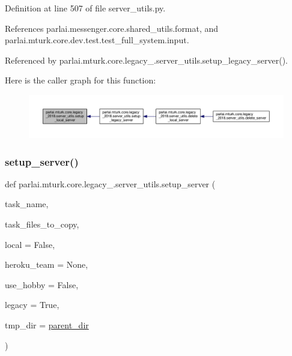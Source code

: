 Definition at line 507 of file server\+\_\+utils.\+py.



References parlai.\+messenger.\+core.\+shared\+\_\+utils.\+format, and parlai.\+mturk.\+core.\+dev.\+test.\+test\+\_\+full\+\_\+system.\+input.



Referenced by parlai.\+mturk.\+core.\+legacy\+\_.\+server\+\_\+utils.\+setup\+\_\+legacy\+\_\+server().

Here is the caller graph for this function\+:
\nopagebreak
\begin{figure}[H]
\begin{center}
\leavevmode
\includegraphics[width=350pt]{namespaceparlai_1_1mturk_1_1core_1_1legacy__2018_1_1server__utils_a2710ac8519a6de20fcc29417582545e6_icgraph}
\end{center}
\end{figure}
\mbox{\label{namespaceparlai_1_1mturk_1_1core_1_1legacy__2018_1_1server__utils_af65b71753d79d3513be6d4c890853a4d}} 
\subsubsection{\texorpdfstring{setup\+\_\+server()}{setup\_server()}}
{\footnotesize\ttfamily def parlai.\+mturk.\+core.\+legacy\+\_.\+server\+\_\+utils.\+setup\+\_\+server (\begin{DoxyParamCaption}\item[{}]{task\+\_\+name,  }\item[{}]{task\+\_\+files\+\_\+to\+\_\+copy,  }\item[{}]{local = {\ttfamily False},  }\item[{}]{heroku\+\_\+team = {\ttfamily None},  }\item[{}]{use\+\_\+hobby = {\ttfamily False},  }\item[{}]{legacy = {\ttfamily True},  }\item[{}]{tmp\+\_\+dir = {\ttfamily \hyperlink{namespaceparlai_1_1mturk_1_1core_1_1legacy__2018_1_1server__utils_a6a871d2f8e5c0768a82ab8fa2e7fadae}{parent\+\_\+dir}} }\end{DoxyParamCaption})}



